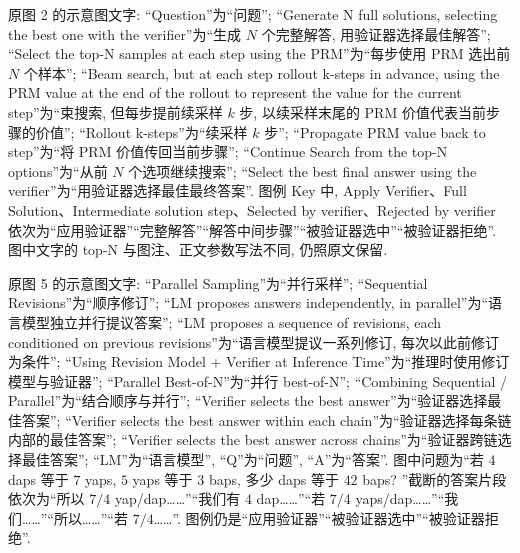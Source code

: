 原图 2 的示意图文字: “Question”为“问题”; “Generate N full solutions, selecting the best one with the verifier”为“生成 $N$ 个完整解答, 用验证器选择最佳解答”; “Select the top-N samples at each step using the PRM”为“每步使用 PRM 选出前 $N$ 个样本”; “Beam search, but at each step rollout k-steps in advance, using the PRM value at the end of the rollout to represent the value for the current step”为“束搜索, 但每步提前续采样 $k$ 步, 以续采样末尾的 PRM 价值代表当前步骤的价值”; “Rollout k-steps”为“续采样 $k$ 步”; “Propagate PRM value back to step”为“将 PRM 价值传回当前步骤”; “Continue Search from the top-N options”为“从前 $N$ 个选项继续搜索”; “Select the best final answer using the verifier”为“用验证器选择最佳最终答案”. 图例 Key 中, Apply Verifier、Full Solution、Intermediate solution step、Selected by verifier、Rejected by verifier 依次为“应用验证器”“完整解答”“解答中间步骤”“被验证器选中”“被验证器拒绝”. 图中文字的 top-N 与图注、正文参数写法不同, 仍照原文保留. 

原图 5 的示意图文字: “Parallel Sampling”为“并行采样”; “Sequential Revisions”为“顺序修订”; “LM proposes answers independently, in parallel”为“语言模型独立并行提议答案”; “LM proposes a sequence of revisions, each conditioned on previous revisions”为“语言模型提议一系列修订, 每次以此前修订为条件”; “Using Revision Model + Verifier at Inference Time”为“推理时使用修订模型与验证器”; “Parallel Best-of-N”为“并行 best-of-N”; “Combining Sequential / Parallel”为“结合顺序与并行”; “Verifier selects the best answer”为“验证器选择最佳答案”; “Verifier selects the best answer within each chain”为“验证器选择每条链内部的最佳答案”; “Verifier selects the best answer across chains”为“验证器跨链选择最佳答案”; “LM”为“语言模型”, “Q”为“问题”, “A”为“答案”. 图中问题为“若 $4$ daps 等于 $7$ yaps, $5$ yaps 等于 $3$ baps, 多少 daps 等于 $42$ baps? ”截断的答案片段依次为“所以 $7/4$ yap/dap……”“我们有 $4$ dap……”“若 $7/4$ yaps/dap……”“我们……”“所以……”“若 $7/4$……”. 图例仍是“应用验证器”“被验证器选中”“被验证器拒绝”. 

